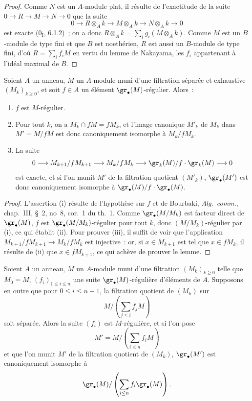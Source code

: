 \begin{proof}
Comme $N$ est un $A$-module plat, il résulte de l'exactitude de la suite
$0\to R\to M\to N\to0$ que la suite
\[
  0\longrightarrow R\otimes_A k\longrightarrow M\otimes_A k
  \longrightarrow N\otimes_A k\longrightarrow0
\]
est exacte ($0_{\mathrm I}$, 6.1.2)~; on a donc
$R\otimes_A k=\sum_i g_i(M\otimes_A k)$. Comme $M$ est un $B$-module de type
fini et que $B$ est noethérien, $R$ est aussi un $B$-module de type fini,
d'où $R=\sum_i f_iM$ en vertu du lemme de Nakayama, les $f_i$ appartenant à
l'idéal maximal de $B$.
\end{proof}

\begin{lemma}[15.1.18]
\label{0.15.1.18-fr}
Soient $A$ un anneau, $M$ un $A$-module muni d'une filtration séparée et
exhaustive $(M_k)_{k\geq0}$, et soit $f\in A$ un élément
$\gr_\bullet(M)$-régulier. Alors~:
\begin{enumerate}
  \item[(i)] $f$ est $M$-régulier.
  \item[(ii)] Pour tout $k$, on a $M_k\cap fM=fM_k$, et l'image canonique
  $M'_k$ de $M_k$ dans $M'=M/fM$ est donc canoniquement isomorphe à
  $M_k/fM_k$.
  \item[(iii)] La suite
  \[
    0\longrightarrow M_{k+1}/fM_{k+1}\longrightarrow M_k/fM_k
    \longrightarrow\gr_k(M)/f\cdot\gr_k(M)\longrightarrow0
  \]
  est exacte, et si l'on munit $M'$ de la filtration quotient $(M'_k)$,
  $\gr_\bullet(M')$ est donc canoniquement isomorphe à
  $\gr_\bullet(M)/f\cdot\gr_\bullet(M)$.
\end{enumerate}
\end{lemma}

\begin{proof}
L'assertion (i) résulte de l'hypothèse sur $f$ et de Bourbaki,
\emph{Alg.~comm.}, chap.~III, \S~2, no~8, cor.~1 du th.~1. Comme
$\gr_\bullet(M/M_k)$ est facteur direct de $\gr_\bullet(M)$, $f$ est
$\gr_\bullet(M/M_k)$-régulier pour tout $k$, donc $(M/M_k)$-régulier par
(i), ce qui établit (ii). Pour prouver (iii), il suffit de voir que
l'application $M_{k+1}/fM_{k+1}\to M_k/fM_k$ est injective~: or, si
$x\in M_{k+1}$ est tel que $x\in fM_k$, il résulte de (ii) que
$x\in fM_{k+1}$, ce qui achève de prouver le lemme.
\end{proof}

\begin{proposition}[15.1.19]
\label{0.15.1.19-fr}
Soient $A$ un anneau, $M$ un $A$-module muni d'une filtration
$(M_k)_{k\geq0}$ telle que $M_0=M$, $(f_i)_{1\leq i\leq n}$ une suite
$\gr_\bullet(M)$-régulière d'éléments de $A$. Supposons en outre que pour
$0\leq i\leq n-1$, la filtration quotient de $(M_k)$ sur
\[
  M/\left(\sum_{j\leq i}f_jM\right)
\]
soit séparée. Alors la suite $(f_i)$ est $M$-régulière, et si l'on pose
\[
  M'=M/\left(\sum_{i\leq n}f_iM\right)
\]
et que l'on munit $M'$ de la filtration quotient de $(M_k)$,
$\gr_\bullet(M')$ est canoniquement isomorphe à
\[
  \gr_\bullet(M)/
  \left(\sum_{i\leq n}f_i\gr_\bullet(M)\right).
\]
\end{proposition}

